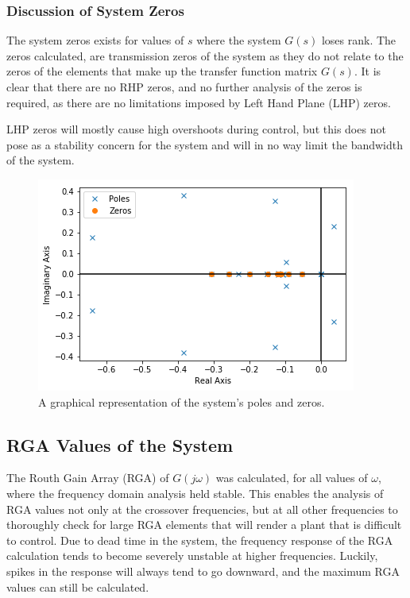 \subsubsection{Discussion of System Zeros}

The system zeros exists for values of $s$ where the system $G(s)$ loses rank. The zeros calculated, are transmission zeros of the system as they do not relate to the zeros of the elements that make up the transfer function matrix $G(s)$. It is clear that there are no RHP zeros, and no further analysis of the zeros is required, as there are no limitations imposed by Left Hand Plane (LHP) zeros. 

LHP zeros will mostly cause high overshoots during control, but this does not pose as a stability concern for the system and will in no way limit the bandwidth of the system.

\begin{figure}[H]
	\centering
	\includegraphics[width=0.7\linewidth]{Figures/Poles_and_Zeros}
	\caption{A graphical representation of the system's poles and zeros.}
	\label{fig:polesandzeros}
\end{figure}

\subsection{RGA Values of the System}
\label{sec:RGA Calculation}

The Routh Gain Array (RGA) of $G(j\omega)$ was calculated, for all values of $\omega$, where the frequency domain analysis held stable. This enables the analysis of RGA values not only at the crossover frequencies, but at all other frequencies to thoroughly check for large RGA elements that will render a plant that is difficult to control. Due to dead time in the system, the frequency response of the RGA calculation tends to become severely unstable at higher frequencies. Luckily, spikes in the response will always tend to go downward, and the maximum RGA values can still be calculated. 


